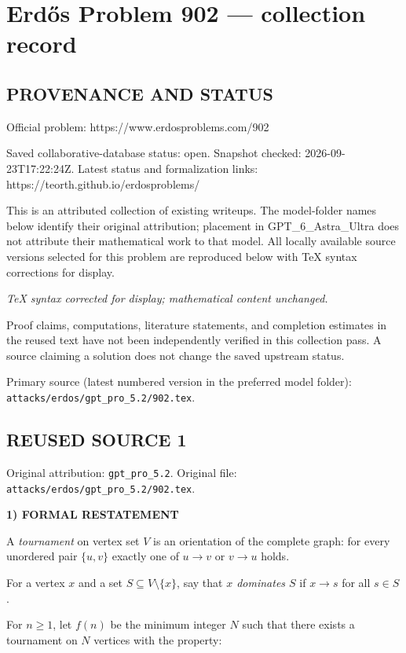 \section*{Erd\H{o}s Problem 902 --- collection record}

\subsection*{PROVENANCE AND STATUS}
Official problem: https://www.erdosproblems.com/902

Saved collaborative-database status: open.
Snapshot checked: 2026-09-23T17:22:24Z.
Latest status and formalization links: https://teorth.github.io/erdosproblems/

This is an attributed collection of existing writeups. The model-folder names below identify their original attribution; placement in GPT\_6\_Astra\_Ultra does not attribute their mathematical work to that model. All locally available source versions selected for this problem are reproduced below with TeX syntax corrections for display.

\emph{TeX syntax corrected for display; mathematical content unchanged.}

Proof claims, computations, literature statements, and completion estimates in the reused text have not been independently verified in this collection pass. A source claiming a solution does not change the saved upstream status.

Primary source (latest numbered version in the preferred model folder): \texttt{attacks/erdos/gpt\_pro\_5.2/902.tex}.

\subsection*{REUSED SOURCE 1}
Original attribution: \texttt{gpt\_pro\_5.2}.
Original file: \texttt{attacks/erdos/gpt\_pro\_5.2/902.tex}.



\noindent\textbf{1) FORMAL RESTATEMENT}

A \emph{tournament} on vertex set $V$ is an orientation of the complete graph:
for every unordered pair $\{u,v\}$ exactly one of $u\to v$ or $v\to u$ holds.

For a vertex $x$ and a set $S\subseteq V\setminus\{x\}$, say that \emph{$x$
dominates $S$} if $x\to s$ for all $s\in S$.

For $n\ge 1$, let $f(n)$ be the minimum integer $N$ such that there exists a
tournament on $N$ vertices with the property:

